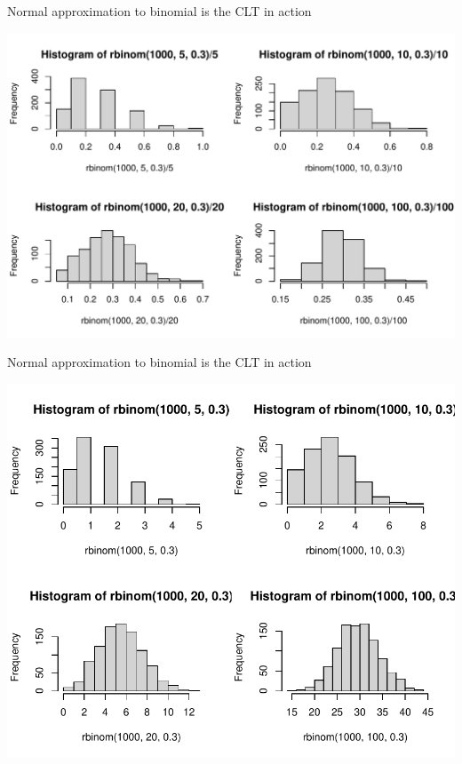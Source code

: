 \documentclass[10pt]{beamer}\usepackage[]{graphicx}\usepackage[]{color}
\makeatletter
\def\maxwidth{ %
  \ifdim\Gin@nat@width>\linewidth
    \linewidth
  \else
    \Gin@nat@width
  \fi
}
\newenvironment{knitrout}{}{} %
\makeatother
\begin{document}
\begin{frame}[fragile]{Normal approximation to binomial is the CLT in action}
\begin{knitrout}\tiny
{}\color{fgcolor}

{\centering \includegraphics[width=\maxwidth]{figure/unnamed-chunk-6-1} 

}


\end{knitrout}
\end{frame}


\begin{frame}[fragile]{Normal approximation to binomial is the CLT in action}
\begin{knitrout}\tiny
{}\color{fgcolor}

{\centering \includegraphics[width=\maxwidth]{figure/unnamed-chunk-7-1} 

}


\end{knitrout}
\end{frame}
\end{document}
